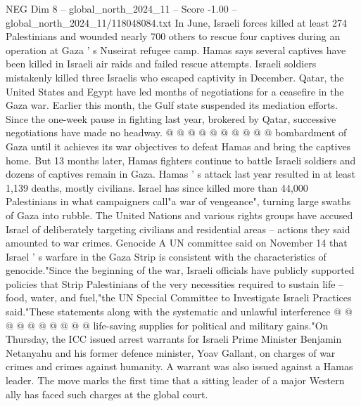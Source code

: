 \begin{textsample}{NEG Dim 8 – global\_north\_2024\_11 – Score -1.00 – global\_north\_2024\_11/118048084.txt}
In June, Israeli forces killed at least 274 Palestinians and wounded nearly 700 others to rescue four captives during an operation at Gaza ' s Nuseirat refugee camp.
Hamas says several captives have been killed in Israeli air raids and failed rescue attempts.
Israeli soldiers mistakenly killed three Israelis who escaped captivity in December.
Qatar, the United States and Egypt have led months of negotiations for a ceasefire in the Gaza war.
Earlier this month, the Gulf state suspended its mediation efforts.
Since the one-week pause in fighting last year, brokered by Qatar, successive negotiations have made no headway. @ @ @ @ @ @ @ @ @ @ bombardment of Gaza until it achieves its war objectives to defeat Hamas and bring the captives home.
But 13 months later, Hamas fighters continue to battle Israeli soldiers and dozens of captives remain in Gaza.
Hamas ' s attack last year resulted in at least 1,139 deaths, mostly civilians.
Israel has since killed more than 44,000 Palestinians in what campaigners call"a war of vengeance", turning large swaths of Gaza into rubble.
The United Nations and various rights groups have accused Israel of deliberately targeting civilians and residential areas -- actions they said amounted to war crimes.
Genocide A UN committee said on November 14 that Israel ' s warfare in the Gaza Strip is consistent with the characteristics of genocide."Since the beginning of the war, Israeli officials have publicly supported policies that Strip Palestinians of the very necessities required to sustain life -- food, water, and fuel,"the UN Special Committee to Investigate Israeli Practices said."These statements along with the systematic and unlawful interference @ @ @ @ @ @ @ @ @ @ life-saving supplies for political and military gains."On Thursday, the ICC issued arrest warrants for Israeli Prime Minister Benjamin Netanyahu and his former defence minister, Yoav Gallant, on charges of war crimes and crimes against humanity.
A warrant was also issued against a Hamas leader.
The move marks the first time that a sitting leader of a major Western ally has faced such charges at the global court.

\end{textsample}
